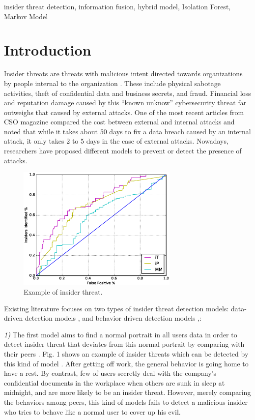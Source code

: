 \documentclass[conference]{IEEEtran}
\begin{document}
\begin{IEEEkeywords}
insider threat detection, information fusion, hybrid model, Isolation Forest, Markov Model
\end{IEEEkeywords}

\section{Introduction}

Insider threats are threats with malicious intent directed towards organizations by people internal to the organization \cite{b1}.
These include physical sabotage activities, theft of confidential data and business secrets, and fraud. Financial loss and reputation damage caused by this ``known unknow'' cybersecurity threat far outweighs that caused by external attacks. One of the most recent articles from CSO magazine \cite{b2} compared the cost between external and internal attacks and noted that while it takes about 50 days to fix a data breach caused by an internal attack, it only takes 2 to 5 days in the case of external attacks. Nowadays, researchers have proposed different models to prevent or detect the presence of attacks.

\begin{figure}[htb]
\centerline{\includegraphics[width = 0.7\textwidth]{figure/figure1.eps}}
\caption{Example of insider threat.}
\label{fig}
\end{figure}

Existing literature focuses on two types of insider threat detection 
models: data-driven detection models \cite{b3},\cite{b4} and behavior driven detection models \cite{b5},\cite{b6}: 

\noindent \emph{1)} The first model aims to find a normal portrait in all users data in order to detect insider threat that deviates from this normal portrait by comparing with their peers \cite{b7}. Fig. 1 shows an example of insider threats which can be detected by this kind of model \cite{b7}. After getting off work, the general behavior is going home to have a rest. By contrast, few of users secretly deal with the company's confidential documents in the workplace when others are sunk in sleep at midnight, and are more likely to be an insider threat. However, merely comparing the behaviors among peers,  this kind of models fails to detect a malicious insider who tries to behave like a normal user to cover up his evil.
\end{document}

